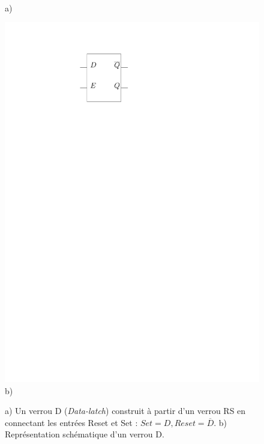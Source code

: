 \begin{figure}[htbp]
\begin{minipage}[c]{.7\linewidth}
\\\centering a)
\end{minipage}\hfill
\begin{minipage}[c]{.1\linewidth}
\includegraphics[width=\columnwidth]{Figs/verrou_D.pdf}
\\\centering b)
\end{minipage}
\caption{\label{fig:verrou_d} a) Un verrou D (\emph{Data-latch}) construit à partir d'un verrou RS en connectant les entrées Reset et Set : $Set = D, Reset = \overline{D}$. b) Représentation schématique d'un verrou D.}
\end{figure}

